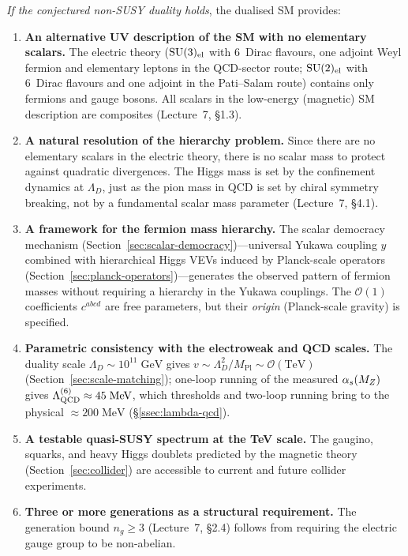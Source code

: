\documentclass[11pt,a4paper]{article}
\begin{document}
\emph{If the conjectured non-SUSY duality holds}, the dualised SM
provides:
\begin{enumerate}
  \item \textbf{An alternative UV description of the SM with no
    elementary scalars.}  The electric theory
    ($\mathrm{SU}(3)_{\mathrm{el}}$ with 6~Dirac flavours, one adjoint Weyl
    fermion and elementary leptons in the QCD-sector route;
    $\mathrm{SU}(2)_{\mathrm{el}}$ with 6~Dirac flavours and one adjoint in the
    Pati--Salam route) contains only fermions and gauge bosons.  All scalars in the
    low-energy (magnetic) SM description are composites
    (Lecture~7, \S1.3).

  \item \textbf{A natural resolution of the hierarchy problem.}
    Since there are no elementary scalars in the electric theory,
    there is no scalar mass to protect against quadratic divergences.
    The Higgs mass is set by the confinement dynamics at $\Lambda_D$,
    just as the pion mass in QCD is set by chiral symmetry breaking,
    not by a fundamental scalar mass parameter (Lecture~7, \S4.1).

  \item \textbf{A framework for the fermion mass hierarchy.}
    The scalar democracy mechanism
    (Section~\ref{sec:scalar-democracy})---universal Yukawa coupling
    $y$ combined with hierarchical Higgs VEVs induced by Planck-scale
    operators (Section~\ref{sec:planck-operators})---generates the
    observed pattern of fermion masses without requiring a hierarchy in
    the Yukawa couplings.  The $\mathcal{O}(1)$ coefficients $c^{abcd}$
    are free parameters, but their \emph{origin} (Planck-scale gravity)
    is specified.

  \item \textbf{Parametric consistency with the electroweak and QCD
    scales.}  The duality scale $\Lambda_D \sim 10^{11}\;\text{GeV}$
    gives
    $v \sim \Lambda_D^2/M_{\text{Pl}} \sim \mathcal{O}(\text{TeV})$
    (Section~\ref{sec:scale-matching}); one-loop running of the
    measured $\alpha_s(M_Z)$ gives $\Lambda_{\mathrm{QCD}}^{(6)} \approx
    45\;\text{MeV}$, which thresholds and two-loop running bring to the
    physical $\approx 200\;\text{MeV}$ (\S\ref{ssec:lambda-qcd}).

  \item \textbf{A testable quasi-SUSY spectrum at the TeV scale.}
    The gaugino, squarks, and heavy Higgs doublets predicted by the
    magnetic theory (Section~\ref{sec:collider}) are accessible to
    current and future collider experiments.

  \item \textbf{Three or more generations as a structural
    requirement.}  The generation bound $n_g \geq 3$
    (Lecture~7, \S2.4) follows from requiring the electric gauge group
    to be non-abelian.
\end{enumerate}
\end{document}
